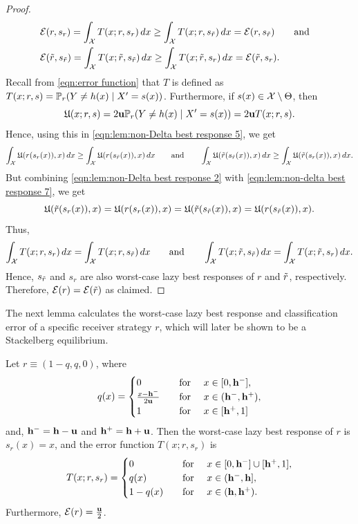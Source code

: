 \begin{proof}
\begin{equation}
        \begin{aligned}
            &\mathcal{E}(r,s_r) = \int_{\mathcal{X}} T(x;r,s_r) \, dx \geq \int_{\mathcal{X}} T(x;r,s_{\tilde{r}}) \, dx = \mathcal{E}(r,s_{\tilde{r}})\quad \hbox{\quad and\quad} \\
            &\mathcal{E}(\tilde{r},s_{\tilde{r}}) = \int_{\mathcal{X}} T(x;\tilde{r},s_{\tilde{r}}) \, dx \geq \int_{\mathcal{X}} T(x;\tilde{r},s_r) \, dx = \mathcal{E}(\tilde{r},s_r).
        \end{aligned}
    \end{equation}
    Recall from \eqref{eqn:error function} that $T$ is defined as $T(x;r,s) = \mathbb{P}_r(Y \neq h(x) \mid X'=s(x))$. Furthermore, if $s(x) \in \mathcal{X} \setminus \Theta$, then $$\mathfrak{U}(x;r,s) = 2\mathbf{u}\mathbb{P}_r(Y \neq h(x) \mid X'=s(x))  = 2\mathbf{u} T(x;r,s).$$ Hence, using this in \eqref{eqn:lem:non-Delta best response 5}, we get
    \[
    \int_{\mathcal{X}} \mathfrak{U}(r(s_r(x)),x) \, dx \geq \int_{\mathcal{X}} \mathfrak{U}(r(s_{\tilde{r}}(x)),x) \, dx \quad \hbox{\quad and\quad} \quad \int_{\mathcal{X}} \mathfrak{U}(\tilde{r}(s_{\tilde{r}}(x)),x) \, dx \geq \int_{\mathcal{X}} \mathfrak{U}(\tilde{r}(s_r(x)),x) \, dx.
    \]
    But combining \eqref{eqn:lem:non-Delta best response 2} with \eqref{eqn:lem:non-delta best response 7}, we get
    \[
    \mathfrak{U}(\tilde{r}(s_r(x)),x) = \mathfrak{U}(r(s_r(x)),x) = \mathfrak{U}(\tilde{r}(s_{\tilde{r}}(x)),x) = \mathfrak{U}(r(s_{\tilde{r}}(x)),x).
    \]
    Thus,
    \begin{equation*}\label{eqn:lem:non-Delta best response 8}
        \int_{\mathcal{X}} T(x;r,s_r) \, dx = \int_{\mathcal{X}} T(x;r,s_{\tilde{r}}) \, dx \quad \hbox{\quad and\quad} \quad \int_{\mathcal{X}} T(x;\tilde{r},s_{\tilde{r}}) \, dx = \int_{\mathcal{X}} T(x;\tilde{r},s_r) \, dx.
    \end{equation*}
    Hence, $s_{\tilde{r}}$ and $s_r$ are also worst-case lazy best responses of $r$ and $\tilde{r}$, respectively. Therefore, $\mathcal{E}(r) = \mathcal{E}(\tilde{r})$ as claimed.
\end{proof}

The next lemma calculates the worst-case lazy best response and classification error of a specific receiver strategy $ r $, which will later be shown to be a Stackelberg equilibrium.

\begin{lem}\label{lem:error is half}
    Let $ r \equiv (1-q,q,0) $, where
    \begin{equation}\label{eqn:q defn}
        q(x) = \begin{cases}
            0 & \hbox{\quad for \quad} x \in [0,\mathbf{h^{-}}], \\
            \frac{x-\mathbf{h^{-}}}{2\mathbf{u}} & \hbox{\quad for \quad} x \in (\mathbf{h^{-}},\mathbf{h^{+}}), \\
            1 & \hbox{\quad for \quad} x \in [\mathbf{h^{+}},1]
        \end{cases}
    \end{equation}
    and, $\mathbf{h^{-}} = \mathbf{h} - \mathbf{u}$ and $\mathbf{h^{+}} = \mathbf{h} + \mathbf{u}$.
    Then the worst-case lazy best response of $ r $ is $ s_r(x) = x $, and the error function $ T(x;r,s_r) $ is
    \[
    T(x;r,s_r) = \begin{cases}
        0 & \hbox{\quad for \quad} x \in [0,\mathbf{h^{-}}] \cup [\mathbf{h^{+}},1], \\
        q(x) & \hbox{\quad for \quad} x \in (\mathbf{h^{-}},\mathbf{h}], \\
        1-q(x) & \hbox{\quad for \quad} x \in (\mathbf{h},\mathbf{h^{+}}).
    \end{cases}
    \]
    Furthermore, $ \mathcal{E}(r) = \frac{\mathbf{u}}{2} $.
\end{lem}

